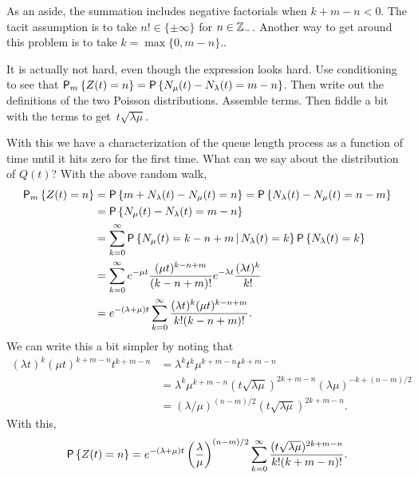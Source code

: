\begin{exercise}
As an aside, the summation includes negative factorials when
$k+m-n<0$. The tacit assumption is to take $n!\in \{\pm \infty\}$ for
$n\in \mathbb{Z}_-$. Another way to get around this problem is to take
$k=\max\{0, m-n\}$..
\begin{hint}
It is actually not hard, even though the expression looks
  hard. Use conditioning to see that
  $\P{Z(t)=n}_m = \P{N_\mu(t) - N_\lambda(t) = m - n}$. Then write out
  the definitions of the two Poisson distributions. Assemble
  terms. Then fiddle a bit with the terms to get~$t\sqrt{\lambda\mu}$. 
\end{hint}
\begin{solution}
With this we have a characterization of the queue length process as a
function of time until it hits zero for the first time. What can we
say about the distribution of $Q(t)$? With the above random walk, 
\begin{equation}\label{eq:29}
  \begin{split}
    \P{Z(t)=n}_m
&= \P{m+N_\lambda(t) - N_\mu(t) = n }  = \P{N_\lambda(t) - N_\mu(t) = n-m }  \\
&= \P{N_\mu(t) - N_\lambda(t) = m-n }  \\
&= \sum_{k=0}^\infty \P{N_\mu(t) = k - n + m\given N_\lambda(t) = k } \P{N_\lambda(t)=k}\\
&= \sum_{k=0}^\infty e^{-\mu t} \frac{(\mu t)^{k -n+m}}{(k-n +m)!} e^{-\lambda t} \frac{(\lambda t)^k}{k!} \\
&= e^{-(\lambda+\mu)t} \sum_{k=0}^\infty \frac{(\lambda t)^k(\mu t)^{k  -n + m }}{k!(k-n+m)!}.
  \end{split}
\end{equation}
We can write this a bit simpler by noting that
\begin{equation*}
  \begin{split}
  (\lambda t)^k (\mu t) ^{k + m - n} t^{k+m-n} 
&=  \lambda^k t^k\mu^{k + m - n} t^{k+m-n} \\
&= \lambda^k \mu^{k + m - n} (t\sqrt{\lambda \mu})^{2k+m-n} (\lambda\mu)^{-k + (n-m)/2} \\
&= (\lambda/\mu)^{(n-m)/2} (t\sqrt{\lambda \mu})^{2k+m-n}.
  \end{split}
\end{equation*}
With this,
\begin{equation*}
    \P{Z(t)=n} 
= e^{-(\lambda+\mu)t} \left(\frac\lambda\mu\right)^{(n-m)/2} \sum_{k=0}^\infty 
\frac{(t\sqrt{\lambda\mu} )^{2k+m-n}}{k!(k+m-n)!}.
\end{equation*}
\end{solution}
\end{exercise}


